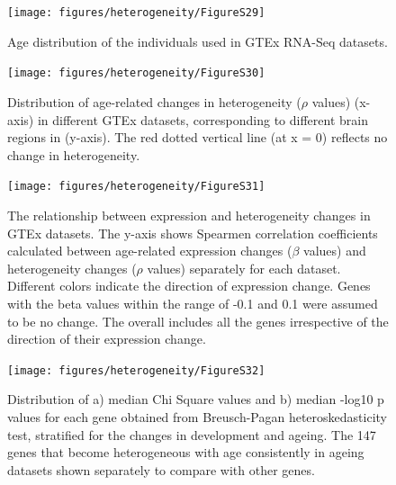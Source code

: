 \documentclass[12pt,twoside]{unicam}
\begin{document}
\begin{figure}

{\centering \texttt{[image: figures/heterogeneity/FigureS29]} 

}

\caption[Age distribution of the individuals used in GTEx RNA-seq datasets.]{Age distribution of the individuals used in GTEx RNA-Seq datasets.}\label{fig:hetFigS29}
\end{figure}

\begin{figure}

{\centering \texttt{[image: figures/heterogeneity/FigureS30]} 

}

\caption[Distribution of age-related changes in heterogeneity ($\rho$ values) in different GTEx datasets, corresponding to different brain regions.]{Distribution of age-related changes in heterogeneity ($\rho$ values) (x-axis) in different GTEx datasets, corresponding to different brain regions in (y-axis). The red dotted vertical line (at x = 0) reflects no change in heterogeneity. }\label{fig:hetFigS30}
\end{figure}

\begin{figure}

{\centering \texttt{[image: figures/heterogeneity/FigureS31]} 

}

\caption[The relationship between expression and heterogeneity changes in GTEx datasets.]{The relationship between expression and heterogeneity changes in GTEx datasets. The y-axis shows Spearmen correlation coefficients calculated between age-related expression changes ($\beta$ values) and heterogeneity changes ($\rho$ values) separately for each dataset. Different colors indicate the direction of expression change. Genes with the beta values within the range of -0.1 and 0.1 were assumed to be no change. The overall includes all the genes irrespective of the direction of their expression change.}\label{fig:hetFigS31}
\end{figure}

\begin{figure}

{\centering \texttt{[image: figures/heterogeneity/FigureS32]} 

}

\caption[Confirmation of the results using Breusch-Pagan test.]{Distribution of a) median Chi Square values and b) median -log10 p values for each gene obtained from Breusch-Pagan heteroskedasticity test, stratified for the changes in development and ageing. The 147 genes that become heterogeneous with age consistently in ageing datasets shown  separately to compare with other genes.}\label{fig:hetFigS32}
\end{figure}
\end{document}
